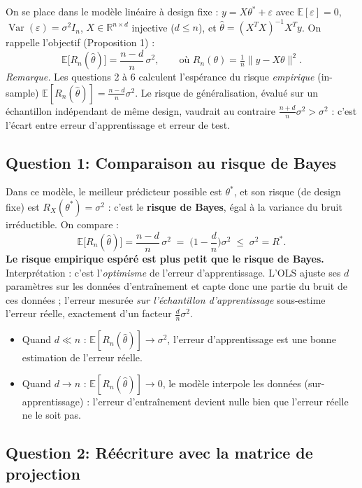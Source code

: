\documentclass[11pt,a4paper]{article}
\newcommand{\R}{\mathbb{R}}
\newcommand{\E}{\mathbb{E}}
\DeclareMathOperator{\Var}{Var}
\theoremstyle{plain}
\begin{document}
On se place dans le modèle linéaire à design fixe :
$y=X\theta^{*}+\varepsilon$ avec $\E[\varepsilon]=0$,
$\Var(\varepsilon)=\sigma^2 I_n$, $X\in\R^{n\times d}$ injective ($d\le n$), et
$\hat\theta=(X^TX)^{-1}X^Ty$. On rappelle l'objectif (Proposition 1) :
\[
    \E\big[R_n(\hat\theta)\big]=\frac{n-d}{n}\,\sigma^2,
    \qquad\text{où } R_n(\theta)=\tfrac1n\lVert y-X\theta\rVert^2 .
\]
\emph{Remarque.} Les questions 2 à 6 calculent l'espérance du risque
\emph{empirique} (in-sample) $\E[R_n(\hat\theta)]=\frac{n-d}{n}\sigma^2$. Le
risque de généralisation, évalué sur un échantillon indépendant de même design,
vaudrait au contraire $\frac{n+d}{n}\sigma^2>\sigma^2$ : c'est l'écart entre
erreur d'apprentissage et erreur de test.

\subsection*{Question 1: Comparaison au risque de Bayes}

Dans ce modèle, le meilleur prédicteur possible est $\theta^{*}$, et son risque
(de design fixe) est $R_X(\theta^{*})=\sigma^2$ : c'est le \textbf{risque de
Bayes}, égal à la variance du bruit irréductible. On compare :
\[
    \E\big[R_n(\hat\theta)\big]=\frac{n-d}{n}\,\sigma^2
    \;=\;\Big(1-\frac{d}{n}\Big)\sigma^2
    \;\le\;\sigma^2 = R^{*}.
\]
\textbf{Le risque empirique espéré est plus petit que le risque de Bayes.}
Interprétation : c'est l'\emph{optimisme} de l'erreur d'apprentissage. L'OLS
ajuste ses $d$ paramètres sur les données d'entraînement et capte donc une partie
du bruit de ces données ; l'erreur mesurée \emph{sur l'échantillon d'apprentissage}
sous-estime l'erreur réelle, exactement d'un facteur $\frac{d}{n}\sigma^2$.
\begin{itemize}[nosep]
  \item Quand $d\ll n$ : $\E[R_n(\hat\theta)]\to\sigma^2$, l'erreur d'apprentissage
        est une bonne estimation de l'erreur réelle.
  \item Quand $d\to n$ : $\E[R_n(\hat\theta)]\to 0$, le modèle interpole les
        données (sur-apprentissage) : l'erreur d'entraînement devient nulle bien
        que l'erreur réelle ne le soit pas.
\end{itemize}

\subsection*{Question 2: Réécriture avec la matrice de projection}
\end{document}

